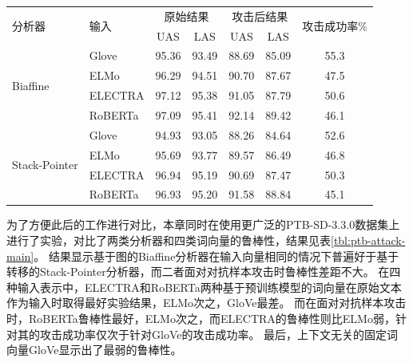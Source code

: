 \begin{table}[htbp]
    \vspace{0.5em}\centering\wuhao
	\begin{tabular}{llccccc}
		\toprule[1.5pt]
		\multirow{2}{*}{分析器}&\multirow{2}{*}{输入}& \multicolumn{2}{c}{原始结果} & \multicolumn{2}{c}{攻击后结果} & \multirow{2}{*}{攻击成功率\%} \\
		\cmidrule(r){3-4} \cmidrule(r){5-6}
		& & UAS & LAS & UAS & LAS \\
		\midrule[1pt]
		\multirow{4}{*}{ Biaffine} & Glove &95.36 & 93.49 &88.69 &85.09 &55.3 \\
		& ELMo  &96.29 &94.51  &90.70 &87.67 &47.5 \\
		& ELECTRA &97.12 & 95.38 &91.05 &87.79 &50.6 \\
		& RoBERTa &97.09 & 95.41 &92.14 &89.42 &46.1 \\
		\hline
		\multirow{4}{*}{ Stack-Pointer} & Glove &94.93 & 93.05 &88.26 &84.64 &52.6 \\
		& ELMo    &95.69 & 93.77 &89.57 &86.49 &46.8 \\
		& ELECTRA &96.94 & 95.19 &90.69 &87.47 &50.3 \\
		& RoBERTa &96.93 & 95.20 &91.58 &88.84 &45.1 \\
		\bottomrule[1.5pt]
	\end{tabular}
\end{table}

为了方便此后的工作进行对比，本章同时在使用更广泛的PTB-SD-3.3.0数据集上进行了实验，对比了两类分析器和四类词向量的鲁棒性，结果见表\ref{tbl:ptb-attack-main}。
结果显示基于图的Biaffine分析器在输入向量相同的情况下普遍好于基于转移的Stack-Pointer分析器，而二者面对对抗样本攻击时鲁棒性差距不大。
在四种输入表示中，ELECTRA和RoBERTa两种基于预训练模型的词向量在原始文本作为输入时取得最好实验结果，ELMo次之，GloVe最差。
而在面对对抗样本攻击时，RoBERTa鲁棒性最好，ELMo次之，而ELECTRA的鲁棒性则比ELMo弱，针对其的攻击成功率仅次于针对GloVe的攻击成功率。
最后，上下文无关的固定词向量GloVe显示出了最弱的鲁棒性。

